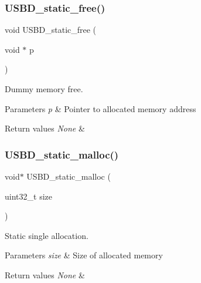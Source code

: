 \subsubsection{\texorpdfstring{U\+S\+B\+D\+\_\+static\+\_\+free()}{USBD\_static\_free()}}
{\footnotesize\ttfamily void U\+S\+B\+D\+\_\+static\+\_\+free (\begin{DoxyParamCaption}\item[{void $\ast$}]{p }\end{DoxyParamCaption})}



Dummy memory free. 


\begin{DoxyParams}{Parameters}
{\em p} & Pointer to allocated memory address \\
\hline
\end{DoxyParams}

\begin{DoxyRetVals}{Return values}
{\em None} & \\
\hline
\end{DoxyRetVals}
\mbox{\label{group__USBD__CONF__Exported__FunctionsPrototype_ga2df01b9aae6026e9f6b55da3b1e72aee}} 
\subsubsection{\texorpdfstring{U\+S\+B\+D\+\_\+static\+\_\+malloc()}{USBD\_static\_malloc()}}
{\footnotesize\ttfamily void$\ast$ U\+S\+B\+D\+\_\+static\+\_\+malloc (\begin{DoxyParamCaption}\item[{uint32\+\_\+t}]{size }\end{DoxyParamCaption})}



Static single allocation. 


\begin{DoxyParams}{Parameters}
{\em size} & Size of allocated memory \\
\hline
\end{DoxyParams}

\begin{DoxyRetVals}{Return values}
{\em None} & \\
\hline
\end{DoxyRetVals}
